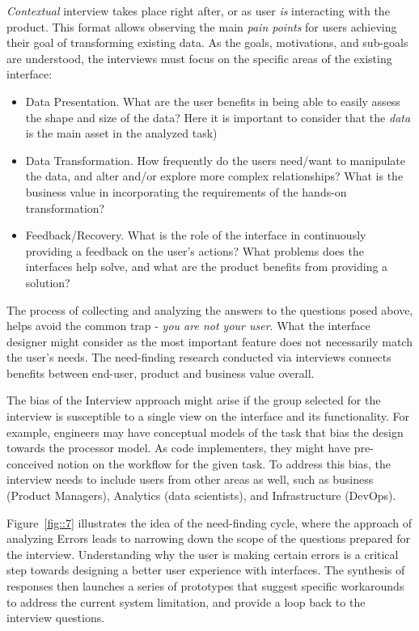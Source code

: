 \documentclass[12pt,letterpaper]{article}
\begin{document}
\textit{Contextual} interview takes place right after, or as user \textit{is} interacting with the product. This format allows observing the main \textit{pain points} for users achieving their goal of transforming existing data. As the goals, motivations, and sub-goals are understood, the interviews must focus on the specific areas of the existing interface:

\begin{itemize}
    \item Data Presentation. What are the user benefits in being able to easily assess the shape and size of the data? Here it is important to consider that the \textit{data} is the main asset in the analyzed task)  
    \item Data Transformation. How frequently do the users need/want to manipulate the data, and alter and/or explore more complex relationships? What is the business value in incorporating the requirements of the hands-on transformation?
    \item Feedback/Recovery. What is the role of the interface in continuously providing a feedback on the user's actions? What problems does the interfaces help solve, and what are the product benefits from providing a solution?
\end{itemize}

The process of collecting and analyzing the answers to the questions posed above, helps avoid the common trap - \textit{you are not your user}. What the interface designer might consider as the most important feature does not necessarily match the user's needs. The need-finding research conducted via interviews connects benefits between end-user, product and business value overall. 

The bias of the Interview approach might arise if the group selected for the interview is susceptible to a single view on the interface and its functionality. For example, engineers may have conceptual models of the task that bias the design towards the processor model. As code implementers, they might have pre-conceived notion on the workflow for the given task. To address this bias, the interview needs to include users from other areas as well, such as business (Product Managers), Analytics (data scientists), and Infrastructure (DevOps). 

Figure~\ref{fig::7} illustrates the idea of the need-finding cycle, where the approach of analyzing Errors leads to narrowing down the scope of the questions prepared for the interview. Understanding why the user is making certain errors is a critical step towards designing a better user experience with interfaces. The synthesis of responses then launches a series of prototypes that suggest specific workarounds to address the current system limitation, and provide a loop back to the interview questions. 
\end{document}

